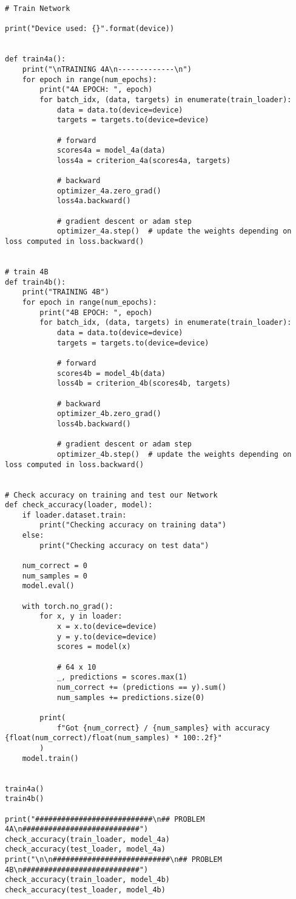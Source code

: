 \begin{verbatim}
# Train Network

print("Device used: {}".format(device))


def train4a():
    print("\nTRAINING 4A\n-------------\n")
    for epoch in range(num_epochs):
        print("4A EPOCH: ", epoch)
        for batch_idx, (data, targets) in enumerate(train_loader):
            data = data.to(device=device)
            targets = targets.to(device=device)

            # forward
            scores4a = model_4a(data)
            loss4a = criterion_4a(scores4a, targets)

            # backward
            optimizer_4a.zero_grad()
            loss4a.backward()

            # gradient descent or adam step
            optimizer_4a.step()  # update the weights depending on loss computed in loss.backward()


# train 4B
def train4b():
    print("TRAINING 4B")
    for epoch in range(num_epochs):
        print("4B EPOCH: ", epoch)
        for batch_idx, (data, targets) in enumerate(train_loader):
            data = data.to(device=device)
            targets = targets.to(device=device)

            # forward
            scores4b = model_4b(data)
            loss4b = criterion_4b(scores4b, targets)

            # backward
            optimizer_4b.zero_grad()
            loss4b.backward()

            # gradient descent or adam step
            optimizer_4b.step()  # update the weights depending on loss computed in loss.backward()


# Check accuracy on training and test our Network
def check_accuracy(loader, model):
    if loader.dataset.train:
        print("Checking accuracy on training data")
    else:
        print("Checking accuracy on test data")

    num_correct = 0
    num_samples = 0
    model.eval()

    with torch.no_grad():
        for x, y in loader:
            x = x.to(device=device)
            y = y.to(device=device)
            scores = model(x)

            # 64 x 10
            _, predictions = scores.max(1)
            num_correct += (predictions == y).sum()
            num_samples += predictions.size(0)

        print(
            f"Got {num_correct} / {num_samples} with accuracy {float(num_correct)/float(num_samples) * 100:.2f}"
        )
    model.train()


train4a()
train4b()

print("###########################\n## PROBLEM 4A\n###########################")
check_accuracy(train_loader, model_4a)
check_accuracy(test_loader, model_4a)
print("\n\n###########################\n## PROBLEM 4B\n###########################")
check_accuracy(train_loader, model_4b)
check_accuracy(test_loader, model_4b)
\end{verbatim}

